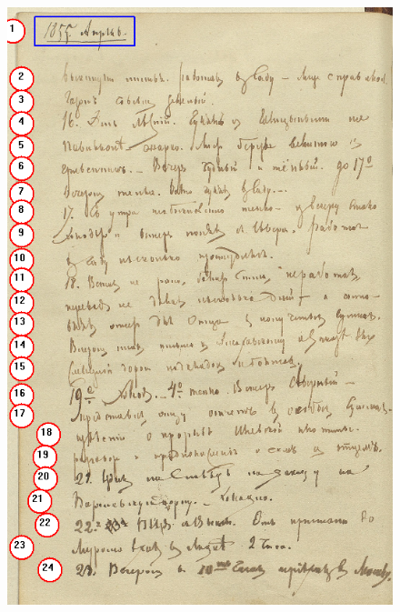 \documentclass{extarticle}
\begin{document}
\begin{figure}[H]
	\centering
	\begin{minipage}{0.49\textwidth}
		\centering
		\includegraphics[width=\textwidth]{images/нарезка_на_строки_1.png}
	\end{minipage}
	\begin{minipage}{0.49\textwidth}
		\centering

\end{minipage}
\end{figure}
\end{document}
